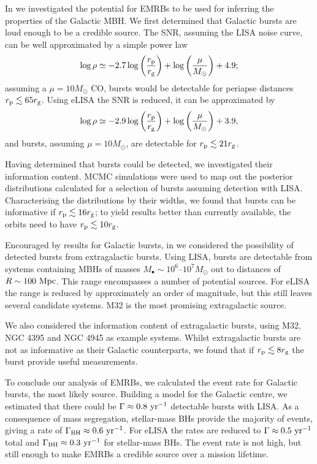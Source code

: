In  we investigated the potential for EMRBs to be used for inferring the properties of the Galactic MBH. We first determined that Galactic bursts are loud enough to be a credible source. The SNR, assuming the LISA noise curve, can be well approximated by a simple power law
\begin{equation}
\log\rho \simeq -2.7\log\left(\dfrac{r_\mathrm{p}}{r_\mathrm{g}}\right) + \log\left(\dfrac{\mu}{M_\odot}\right) + 4.9;
\end{equation}
assuming a $\mu = 10 M_\odot$ CO, bursts would be detectable for periapse distances $r_\mathrm{p} \lesssim 65 r_\mathrm{g}$. Using eLISA the SNR is reduced, it can be approximated by 
\begin{equation}
\log\rho \simeq -2.9\log\left(\dfrac{r_\mathrm{p}}{r_\mathrm{g}}\right) + \log\left(\dfrac{\mu}{M_\odot}\right) + 3.9,
\end{equation}
and bursts, assuming $\mu = 10 M_\odot$, are detectable for $r_\mathrm{p} \lesssim 21 r_\mathrm{g}$.

Having determined that bursts could be detected, we investigated their information content. MCMC simulations were used to map out the posterior distributions calculated for a selection of bursts assuming detection with LISA. Characterising the distributions by their widths, we found that bursts can be informative if $r_\mathrm{p} \lesssim 16 r_\mathrm{g}$; to yield results better than currently available, the orbits need to have $r_\mathrm{p} \lesssim 10 r_\mathrm{g}$.

Encouraged by results for Galactic bursts, in  we considered the possibility of detected bursts from extragalactic bursts. Using LISA, bursts are detectable from systems containing MBHs of masses $M_\bullet \sim 10^6$--$10^7 M_\odot$ out to distances of $R \sim 100~\mathrm{Mpc}$. This range encompasses a number of potential sources. For eLISA the range is reduced by approximately an order of magnitude, but this still leaves several candidate systems. M32 is the most promising extragalactic source.

We also considered the information content of extragalactic bursts, using M32, NGC 4395 and NGC 4945 as example systems. Whilst extragalactic bursts are not as informative as their Galactic counterparts, we found that if $r_\mathrm{p} \lesssim 8 r_\mathrm{g}$ the burst provide useful measurements.

To conclude our analysis of EMRBs, we calculated the event rate for Galactic bursts, the most likely source. Building a model for the Galactic centre, we estimated that there could be $\Gamma \approx 0.8~\mathrm{yr^{-1}}$ detectable bursts with LISA. As a consequence of mass segregation, stellar-mass BHs provide the majority of events, giving a rate of $\Gamma_\mathrm{BH} \approx 0.6~\mathrm{yr^{-1}}$. For eLISA the rates are reduced to $\Gamma \approx 0.5~\mathrm{yr^{-1}}$ total and $\Gamma_\mathrm{BH} \approx 0.3~\mathrm{yr^{-1}}$ for stellar-mass BHs. The event rate is not high, but still enough to make EMRBs a credible source over a mission lifetime.

